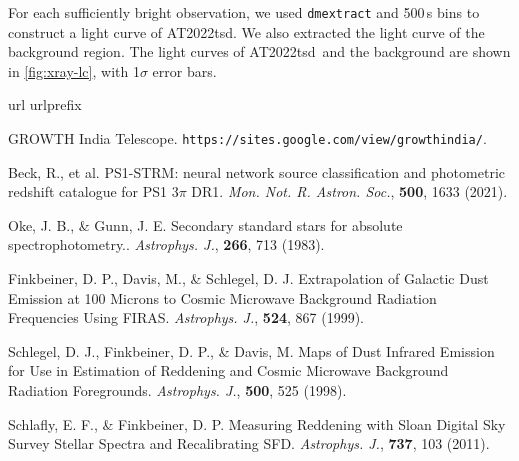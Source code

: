 \documentclass{nature_plusfigure}
\newcommand{\mn}{{Mon. Not. R. Astron. Soc.}}
\newcommand{\mnras}{\mn}
\newcommand{\apj}{{Astrophys. J.}}
\newcommand{\at}{AT2022tsd}
\begin{document}
\begin{methods}
For each sufficiently bright observation, we used \texttt{dmextract} and 500\,s bins to construct a light curve of \at. We also extracted the light curve of the background region. The light curves of \at\ and the background are shown in \ref{fig:xray-lc}, with 1$\sigma$ error bars.

%
%

\begin{thebibliography}{10}
\expandafter\ifx\csname url\endcsname\relax
  \def\url#1{\texttt{#1}}\fi
\expandafter\ifx\csname urlprefix\endcsname\relax\def\urlprefix{URL }\fi
\providecommand{\bibinfo}[2]{#2}
\providecommand{\eprint}[2][]{\url{#2}}
\makeatletter
\addtocounter{\@listctr}{30}
\makeatother


\bibinfo{title}{{GROWTH India Telescope}}.
\newblock
  \bibinfo{howpublished}{\url{https://sites.google.com/view/growthindia/}}.


 Beck, R., et al. PS1-STRM: neural network source classification and photometric redshift catalogue for PS1 3$\pi$ DR1. \emph{\mnras}, \textbf{500}, 1633 (2021). 

 Oke, J. B., \& Gunn, J. E. Secondary standard stars for absolute spectrophotometry.. \emph{\apj}, \textbf{266}, 713 (1983). 

 Finkbeiner, D. P., Davis, M., \& Schlegel, D. J. Extrapolation of Galactic Dust Emission at 100 Microns to Cosmic Microwave Background Radiation Frequencies Using FIRAS. \emph{\apj}, \textbf{524}, 867 (1999). 
 
 Schlegel, D. J., Finkbeiner, D. P., \& Davis, M. Maps of Dust Infrared Emission for Use in Estimation of Reddening and Cosmic Microwave Background Radiation Foregrounds. \emph{\apj}, \textbf{500}, 525 (1998). 

 Schlafly, E. F., \& Finkbeiner, D. P. Measuring Reddening with Sloan Digital Sky Survey Stellar Spectra and Recalibrating SFD. \emph{\apj}, \textbf{737}, 103 (2011). 
 


\end{thebibliography}
\end{methods}
\end{document}
